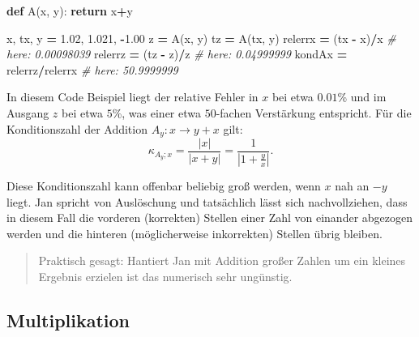 \documentclass[
]{book}
\newenvironment{Shaded}{\begin{snugshade}}{\end{snugshade}}
\newcommand{\CommentTok}[1]{\textcolor[rgb]{0.56,0.35,0.01}{\textit{#1}}}
\newcommand{\ControlFlowTok}[1]{\textcolor[rgb]{0.13,0.29,0.53}{\textbf{#1}}}
\newcommand{\FloatTok}[1]{\textcolor[rgb]{0.00,0.00,0.81}{#1}}
\newcommand{\KeywordTok}[1]{\textcolor[rgb]{0.13,0.29,0.53}{\textbf{#1}}}
\newcommand{\NormalTok}[1]{#1}
\newcommand{\OperatorTok}[1]{\textcolor[rgb]{0.81,0.36,0.00}{\textbf{#1}}}
\newenvironment {JHSAYS} [0] {\begin{quote}\color{jhsc}} {\end{quote}}
\theoremstyle{definition}
\theoremstyle{definition}
\theoremstyle{definition}
\theoremstyle{definition}
\theoremstyle{remark}
\begin{document}
\begin{Shaded}
\begin{Highlighting}[]
\KeywordTok{def}\NormalTok{ A(x, y):}
    \ControlFlowTok{return}\NormalTok{ x}\OperatorTok{+}\NormalTok{y}

\NormalTok{x, tx, y }\OperatorTok{=} \FloatTok{1.02}\NormalTok{, }\FloatTok{1.021}\NormalTok{, }\OperatorTok{{-}}\FloatTok{1.00}
\NormalTok{z }\OperatorTok{=}\NormalTok{ A(x, y)}
\NormalTok{tz }\OperatorTok{=}\NormalTok{ A(tx, y)}
\NormalTok{relerrx }\OperatorTok{=}\NormalTok{ (tx }\OperatorTok{{-}}\NormalTok{ x)}\OperatorTok{/}\NormalTok{x        }\CommentTok{\# here: 0.00098039}
\NormalTok{relerrz }\OperatorTok{=}\NormalTok{ (tz }\OperatorTok{{-}}\NormalTok{ z)}\OperatorTok{/}\NormalTok{z        }\CommentTok{\# here: 0.04999999}
\NormalTok{kondAx }\OperatorTok{=}\NormalTok{ relerrz}\OperatorTok{/}\NormalTok{relerrx    }\CommentTok{\# here: 50.9999999}
\end{Highlighting}
\end{Shaded}

In diesem Code Beispiel liegt der relative Fehler in \(x\) bei etwa \(0.01\)\% und im Ausgang \(z\) bei etwa \(5\)\%, was einer etwa \(50\)-fachen Verstärkung entspricht.
Für die Konditionszahl der Addition \(A_y\colon x \to y+x\) gilt:
\begin{equation*}
\kappa_{A_y;x} = \frac{|x|}{|x+y|} = \frac{1}{|1+\frac{y}{x}|}.
\end{equation*}

Diese Konditionszahl kann offenbar beliebig groß werden, wenn \(x\) nah an \(-y\) liegt. Jan spricht von Auslöschung und tatsächlich lässt sich nachvollziehen, dass in diesem Fall die vorderen (korrekten) Stellen einer Zahl von einander abgezogen werden und die hinteren (möglicherweise inkorrekten) Stellen übrig bleiben.

\leavevmode\hypertarget{rem-accu-iter}{}%
\begin{JHSAYS}
Praktisch gesagt: Hantiert Jan mit Addition großer Zahlen um ein kleines Ergebnis erzielen ist das numerisch sehr ungünstig.

\end{JHSAYS}

\hypertarget{multiplikation}{%
\subsection{Multiplikation}\label{multiplikation}}
\end{document}

